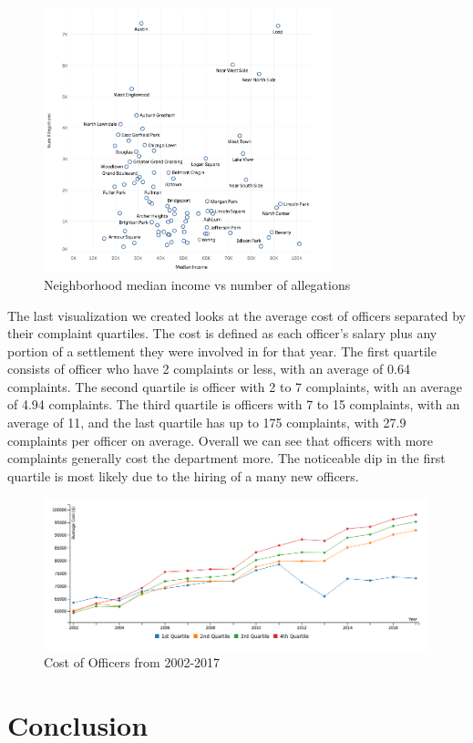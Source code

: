 \documentclass[11pt]{article}
\begin{document}
\begin{figure}[h]
\centering
\caption{Neighborhood median income vs number of allegations}
\includegraphics[width=0.75\textwidth]{scatter.png}
\end{figure}

The last visualization we created looks at the average cost of officers separated by their complaint quartiles. The cost is defined as each officer's salary plus any portion of a settlement they were involved in for that year. The first quartile consists of officer who have 2 complaints or less, with an average of 0.64 complaints. The second quartile is officer with 2 to 7 complaints, with an average of 4.94 complaints. The third quartile is officers with 7 to 15 complaints, with an average of 11, and the last quartile has up to 175 complaints, with 27.9 complaints per officer on average. Overall we can see that officers with more complaints generally cost the department more. The noticeable dip in the first quartile is most likely due to the hiring of a many new officers.

\begin{figure}[h]
\caption{Cost of Officers from 2002-2017}
\includegraphics[width=\textwidth]{costline.png}
\end{figure}

\FloatBarrier
\section{Conclusion}
\end{document}
